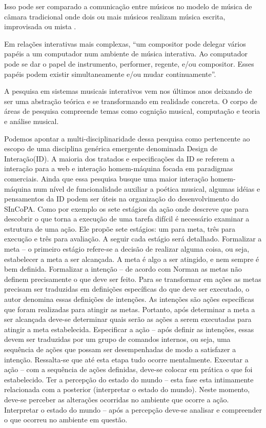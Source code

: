 \documentclass[draft]{ppgmus}
\begin{document}
Isso pode ser comparado a comunicação entre músicos no modelo de  música de 
câmara tradicional onde dois ou mais músicos realizam música escrita, improvisada 
ou mista \cite{winkler93:interactive}.

Em relações interativas mais complexas, ``um compositor pode
delegar vários papéis a um computador num ambiente de música interativa. Ao
computador pode se dar o papel de instrumento, performer, regente, e/ou compositor.
Esses papéis podem existir  simultaneamente e/ou mudar continuamente''\cite{lippe:2002}.



A pesquisa em sistemas musicais interativos vem nos últimos anos
deixando de ser uma abstração teórica e se transformando em realidade
concreta. O corpo de áreas de pesquisa compreende temas como cognição
musical, computação e teoria e análise musical.


Podemos apontar a multi-disciplinaridade dessa pesquisa como pertencente 
ao escopo de uma disciplina genérica emergente denominada Design de Interação(ID).
A maioria dos tratados e especificações da ID se referem a interação para a web
e interação homem-máquina focada em paradigmas comerciais. Ainda que essa pesquisa busque
uma maior interação homem-máquina num nível de funcionalidade auxiliar a poética musical, algumas idéias e 
pensamentos da ID podem ser úteis na organização do desenvolvimento do SInCoPA. 
Como por exemplo os sete estágios da ação \cite{norman06:design} onde descreve que para 
descobrir o que torna a
execução de uma tarefa difícil é necessário examinar a
estrutura de uma ação. Ele propõe sete estágios: um para
meta, três para execução e três para avaliação. A seguir cada
estágio será detalhado.
Formalizar a meta – o primeiro estágio refere-se a decisão de
realizar alguma coisa, ou seja, estabelecer a meta a ser
alcançada. A meta é algo a ser atingido, e nem sempre é bem
definida.
Formalizar a intenção – de acordo com Norman as
metas não definem precisamente o que deve ser feito. Para
se transformar em ações as metas precisam ser traduzidas
em definições específicas do que deve ser executado, o autor
denomina essas definições de intenções. As intenções são
ações específicas que foram realizadas para atingir as metas.
Portanto, após determinar a meta a ser alcançada deve-se
determinar quais serão as ações a serem executadas para
atingir a meta estabelecida.
Especificar a ação – após definir as intenções, essas devem
ser traduzidas por um grupo de comandos internos, ou seja,
uma sequência de ações que possam ser desempenhadas de
modo a satisfazer a intenção. Ressalta-se que até esta etapa
tudo ocorre mentalmente.
Executar a ação – com a sequência de ações definidas,
deve-se colocar em prática o que foi estabelecido.
Ter a percepção do estado do mundo – esta fase esta
intimamente relacionada com a posterior (interpretar o estado
do mundo). Neste momento, deve-se perceber as alterações
ocorridas no ambiente que ocorre a ação.
Interpretar o estado do mundo – após a percepção deve-se
analisar e compreender o que ocorreu no ambiente em
questão.
\end{document}
